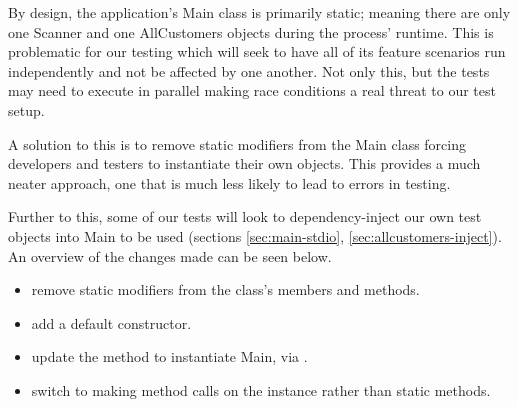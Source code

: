By design, the application's Main class is primarily static; meaning there are only one Scanner and one AllCustomers objects during the process' runtime. This is problematic for our testing which will seek to have all of its feature scenarios run independently and not be affected by one another. Not only this, but the tests may need to execute in parallel making race conditions a real threat to our test setup. 
\par
A solution to this is to remove static modifiers from the Main class forcing developers and testers to instantiate their own objects. This provides a much neater approach, one that is much less likely to lead to errors in testing. 
\par
Further to this, some of our tests will look to dependency-inject our own test objects into Main to be used (sections \ref{sec:main-stdio}, \ref{sec:allcustomers-inject}). An overview of the changes made can be seen below.
\begin{itemize}
	\item remove static modifiers from the class's members and methods.  
	\item add a default constructor.
	\item update the  method to instantiate Main, via .
	\item switch to making method calls on the instance rather than static methods. 
\end{itemize}

